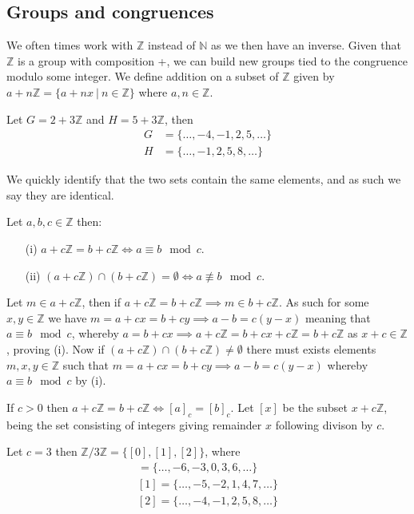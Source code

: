 \subsection{Groups and congruences}
We often times work with $\mathbb{Z}$ instead of $\mathbb{N}$ as we then have an inverse. Given that $\mathbb{Z}$ is a group with composition +, we can build new groups tied to the congruence modulo some integer. We define addition on a subset of $\mathbb{Z}$ given by $a+n\mathbb{Z}=\{a+nx~|~n\in\mathbb{Z}\}$ where $a,n\in\mathbb{Z}$.
\begin{exmp}
    Let $G=2+3\mathbb{Z}$ and $H=5+3\mathbb{Z}$, then
    \begin{align*}
        G&=\{\ldots,-4,-1,2,5,\ldots\} \\
        H&=\{\ldots,-1,2,5,8,\ldots\}
    \end{align*}\vskip -10pt
\end{exmp}
We quickly identify that the two sets contain the same elements, and as such we say they are identical.
\begin{prop}
    Let $a,b,c\in\mathbb{Z}$ then: 
    \begin{itemize}
        \item[(i)] $a+c\mathbb{Z}=b+c\mathbb{Z}\iff a\equiv b\mod c$.
        \item[(ii)] $(a+c\mathbb{Z})\cap(b+c\mathbb{Z})=\emptyset\iff a\not\equiv b\mod c$.
    \end{itemize}
\end{prop}
\begin{prf}
    Let $m\in a+c\mathbb{Z}$, then if $a+c\mathbb{Z}=b+c\mathbb{Z}\implies m\in b+c\mathbb{Z}$. As such for some $x,y\in\mathbb{Z}$ we have $m=a+cx=b+cy\implies a-b=c(y-x)$ meaning that $a\equiv b\mod c$, whereby $a=b+cx\implies a+c\mathbb{Z}=b+cx+c\mathbb{Z}=b+c\mathbb{Z}$ as $x+c\in \mathbb{Z}$, proving (i). Now if $(a+c\mathbb{Z})\cap(b+c\mathbb{Z})\neq\emptyset$ there must exists elements $m,x,y\in\mathbb{Z}$ such that $m=a+cx=b+cy\implies a-b=c(y-x)$ whereby $a\equiv b\mod c$ by (i).
\end{prf}
If $c>0$ then $a+c\mathbb{Z}=b+c\mathbb{Z}\iff [a]_{c}=[b]_{c}$. Let $[x]$ be the subset $x+c\mathbb{Z}$, being the set consisting of integers giving remainder $x$ following divison by $c$.
\begin{exmp}
    Let $c=3$ then $\mathbb{Z}/3\mathbb{Z}=\{[0],[1],[2]\}$, where
    \begin{align*}
        [0]=\{\ldots,-6,-3,0,3,6,\ldots\} \\
        [1]=\{\ldots,-5,-2,1,4,7,\ldots\} \\
        [2]=\{\ldots,-4,-1,2,5,8,\ldots\}
    \end{align*}\vskip -10pt
\end{exmp}
